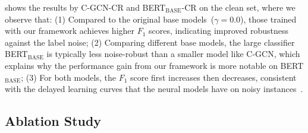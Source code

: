 \documentclass[11pt]{article}
\begin{document}
 shows the results by C-GCN-CR and BERT$_\text{BASE}$-CR on the clean set, where we observe that:
(1) Compared to the original base models~($\gamma=0.0$), those trained with our framework achieves higher $F_1$ scores, indicating improved robustness against the label noise;
(2) Comparing different base models, the large classifier BERT$_\text{BASE}$ is typically less noise-robust than a smaller model like C-GCN, which explains why the performance gain from our framework is more notable on BERT$_\text{BASE}$;
(3) For both models, the $F_1$ score first increases then decreases, consistent with the delayed learning curves that the neural models have on noisy instances~\cite{Arpit2017ACL}.

\begin{table}[!t]
\centering
{}
    \caption{$\bm{F}_1$ score (\%) on the dev and test set of CoNLL03. $\clubsuit$ marks results obtained using the originally released code.}\label{tab::ner}
\end{table}

\subsection{Ablation Study}\label{sec:ablation}
\end{document}
